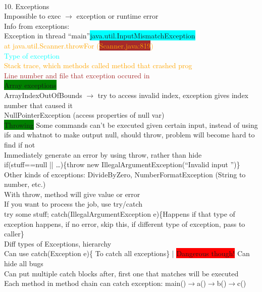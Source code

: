 ~\\ \color{Fuchsia}
10. Exceptions
\\ Impossible to exec $\rightarrow$ exception or runtime error
\\ Info from exceptions: 
\\ Exception in thread \textquotedblleft main\textquotedblright \colorbox{Cyan}{java.util.InputMismatchException}
\\ \phantom{abc}\textcolor{Orange}{at java.util.Scanner.throwFor (\colorbox{Brown}{Scanner.java:819})}
\\ \textcolor{Cyan}{Type of exception}
\\ \textcolor{Orange}{Stack trace, which methods called method that crashed prog}
\\ \textcolor{Brown}{Line number and file that exception occured in}
\\ \colorbox{Green}{Array exceptions}
\\ ArrayIndexOutOfBounds $\rightarrow$ try to access invalid index, exception gives index number that caused it
\\NullPointerException (access properties of null var)
\\ \colorbox{Green}{Throwing} Some commands can't be executed given certain input, instead of using ifs and whatnot to make output null, should throw, problem will become hard to find if not
\\ Immediately generate an error by using throw, rather than hide
\\ if(stuff==null || \ldots)\{throw new IllegalArgumentException(\textquotedblleft Invalid input \textquotedblright)\}
\\ Other kinds of exceptions: DivideByZero, NumberFormatException (String to number, etc.)
\\With throw, method will give value or error
\\ If you want to process the job, use try/catch
\\ try{ some stuff;} catch(IllegalArgumentException e)\{Happens if that type of exception happens, if no error, skip this, if different type of exception, pass to caller\}
\\ Diff types of Exceptions, hierarchy 
\\ Can use catch(Exception e)\{ To catch all exceptions\} | \colorbox{Red}{Dangerous though!} Can hide all bugs
\\ Can put multiple catch blocks after, first one that matches will be executed
\\ Each method in method chain can catch exception: main()$\rightarrow$a()$\rightarrow$b()$\rightarrow$c()
